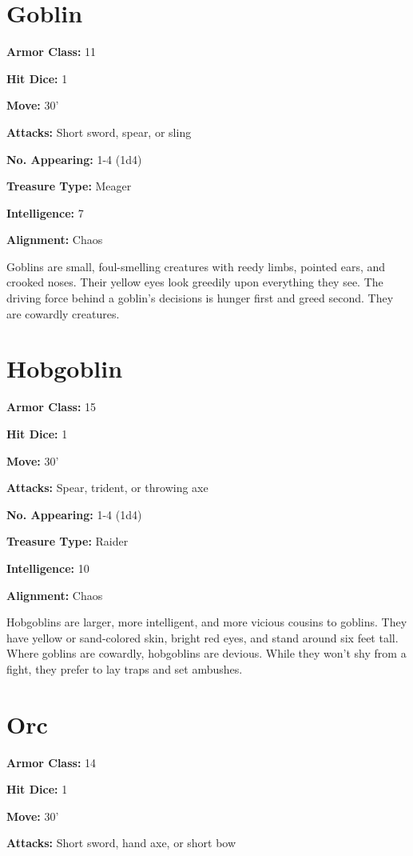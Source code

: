 \begin{multicols}{2}
\section{Goblin}

\textbf{Armor Class:} 11

\textbf{Hit Dice:} 1

\textbf{Move:} 30'

\textbf{Attacks:} Short sword, spear, or sling

\textbf{No. Appearing:} 1-4 (1d4)

\textbf{Treasure Type:} Meager

\textbf{Intelligence:} 7

\textbf{Alignment:} Chaos

Goblins are small, foul-smelling creatures with reedy limbs,
pointed ears, and crooked noses. Their yellow eyes look greedily
upon everything they see. The driving force behind a goblin's
decisions is hunger first and greed second. They are cowardly
creatures.

\section{Hobgoblin}

\textbf{Armor Class:} 15

\textbf{Hit Dice:} 1

\textbf{Move:} 30'

\textbf{Attacks:} Spear, trident, or throwing axe

\textbf{No. Appearing:} 1-4 (1d4)

\textbf{Treasure Type:} Raider

\textbf{Intelligence:} 10

\textbf{Alignment:} Chaos

Hobgoblins are larger, more intelligent, and more vicious
cousins to goblins. They have yellow or sand-colored skin,
bright red eyes, and stand around six feet tall. Where
goblins are cowardly, hobgoblins are devious. While they
won't shy from a fight, they prefer to lay traps and set
ambushes.

\section{Orc}

\textbf{Armor Class:} 14

\textbf{Hit Dice:} 1

\textbf{Move:} 30'

\textbf{Attacks:} Short sword, hand axe, or short bow


\end{multicols}
